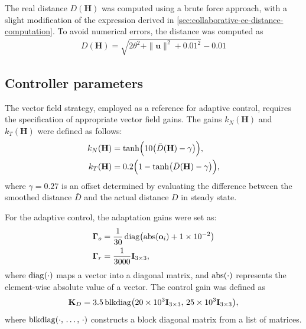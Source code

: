The real distance $D(\mathbf{H})$ was computed using a brute force approach, with a slight modification of the expression derived in \cref{sec:collaborative-ee-distance-computation}. To avoid numerical errors, the distance was computed as
\begin{align}
    D(\mathbf{H}) = \sqrt{2\theta^2 + \|\mathbf{u}\|^2 + 0.01^2} - 0.01
\end{align}

\subsection{Controller parameters}
The vector field strategy, employed as a reference for adaptive control, requires the specification of appropriate vector field gains. The gains $k_N(\mathbf{H})$ and $k_T(\mathbf{H})$ were defined as follows:
\begin{align}
    k_N(\mathbf{H}) &= \tanh\Bigl(10\bigl(\bar{D}(\mathbf{H})- \gamma\bigr)\Bigr),\\
    k_T(\mathbf{H}) &= 0.2\Bigl(1 - \tanh\bigl(\bar{D}(\mathbf{H}) - \gamma\bigr)\Bigr),
\end{align}
where $\gamma=0.27$ is an offset determined by evaluating the difference between the smoothed distance $\bar{D}$ and the actual distance $D$ in steady state.

For the adaptive control, the adaptation gains were set as:
\begin{align}
    \boldsymbol{\Gamma}_o &= \frac{1}{30}\operatorname{diag}\bigl(\operatorname{abs}(\mathbf{o}_i) + \num{1E-2}\bigr)\\
    \boldsymbol{\Gamma}_r &= \frac{1}{3000}\mathbf{I}_{3\times3},
\end{align}
where $\operatorname{diag}(\cdot)$ maps a vector into a diagonal matrix, and $\operatorname{abs}(\cdot)$ represents the element-wise absolute value of a vector. The control gain was defined as
\begin{align}
    \mathbf{K}_D = 3.5\operatorname{blkdiag}\bigl(\num{20E3}\mathbf{I}_{3\times3},\, \num{25E3}\mathbf{I}_{3\times3}\bigr),
\end{align}
where $\operatorname{blkdiag}(\cdot,\, \dots,\, \cdot)$ constructs a block diagonal matrix from a list of matrices.
